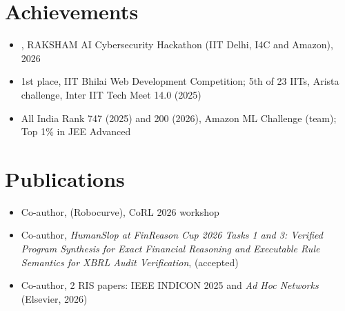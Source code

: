 \documentclass[10pt]{article}
\begin{document}
\section{Achievements}
\begin{itemize}
\item {}, RAKSHAM AI Cybersecurity Hackathon (IIT Delhi, I4C and Amazon), 2026
\item 1st place, IIT Bhilai Web Development Competition; 5th of 23 IITs, Arista challenge, Inter IIT Tech Meet 14.0 (2025)
\item All India Rank 747 (2025) and 200 (2026), Amazon ML Challenge (team); Top 1\% in JEE Advanced
\end{itemize}

\section{Publications}
\begin{itemize}
\item Co-author,  (Robocurve), CoRL 2026 workshop
\item Co-author, \textit{HumanSlop at FinReason Cup 2026 Tasks 1 and 3: Verified Program Synthesis for Exact Financial Reasoning and Executable Rule Semantics for XBRL Audit Verification},  (accepted)
\item Co-author, 2 RIS papers: IEEE INDICON 2025 and \textit{Ad Hoc Networks} (Elsevier, 2026)
\end{itemize}
\end{document}
